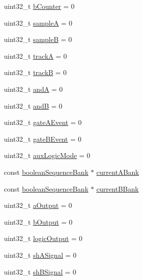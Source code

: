 \begin{DoxyCompactItemize}
uint32\+\_\+t \mbox{\hyperlink{class_dual_euclidean_a5313528458ec30301e147c1ea7908d25}{b\+Counter}} = 0
\item 
uint32\+\_\+t \mbox{\hyperlink{class_dual_euclidean_a80ac40990fb9804313428fc88bb25a00}{sampleA}} = 0
\item 
uint32\+\_\+t \mbox{\hyperlink{class_dual_euclidean_ac7586dbe4b5473ad464f51ce8315c25e}{sampleB}} = 0
\item 
uint32\+\_\+t \mbox{\hyperlink{class_dual_euclidean_a9c9f254af7b89c373ce03d8b857b2477}{trackA}} = 0
\item 
uint32\+\_\+t \mbox{\hyperlink{class_dual_euclidean_a9c2333d598bf61280491b69b2e01e8e1}{trackB}} = 0
\item 
uint32\+\_\+t \mbox{\hyperlink{class_dual_euclidean_a37738201f93b6762ff5eef6e3f231f3b}{andA}} = 0
\item 
uint32\+\_\+t \mbox{\hyperlink{class_dual_euclidean_a7e2d80e82bb30ced0df37b75d21533ca}{andB}} = 0
\item 
uint32\+\_\+t \mbox{\hyperlink{class_dual_euclidean_a0ff6e722af5d341219112ed173fe2d6a}{gate\+A\+Event}} = 0
\item 
uint32\+\_\+t \mbox{\hyperlink{class_dual_euclidean_acf70f4efc7acca8111895c6a71f59bb5}{gate\+B\+Event}} = 0
\item 
uint32\+\_\+t \mbox{\hyperlink{class_dual_euclidean_ab28bd6271a4cc839b1419091f7a47e96}{aux\+Logic\+Mode}} = 0
\item 
const \mbox{\hyperlink{structboolean_sequence_bank}{boolean\+Sequence\+Bank}} $\ast$ \mbox{\hyperlink{class_dual_euclidean_a8c4259c3b82f62c4c3a2b5a7b2a511fb}{current\+A\+Bank}}
\item 
const \mbox{\hyperlink{structboolean_sequence_bank}{boolean\+Sequence\+Bank}} $\ast$ \mbox{\hyperlink{class_dual_euclidean_a72c4896af54012858903e8f3c33a2658}{current\+B\+Bank}}
\item 
uint32\+\_\+t \mbox{\hyperlink{class_dual_euclidean_ad814adf2f1fc533982bbd1f89eb0bee9}{a\+Output}} = 0
\item 
uint32\+\_\+t \mbox{\hyperlink{class_dual_euclidean_a97d63f45f6721a70490326a318c0445d}{b\+Output}} = 0
\item 
uint32\+\_\+t \mbox{\hyperlink{class_dual_euclidean_aa4a22dc6a09b16fd2e190b64ceeaa104}{logic\+Output}} = 0
\item 
uint32\+\_\+t \mbox{\hyperlink{class_dual_euclidean_aabf24d1670dc2701f468be10995683c9}{sh\+A\+Signal}} = 0
\item 
uint32\+\_\+t \mbox{\hyperlink{class_dual_euclidean_a9faf2d0a2cd274892651d0c35e5cbcf0}{sh\+B\+Signal}} = 0
\end{DoxyCompactItemize}
